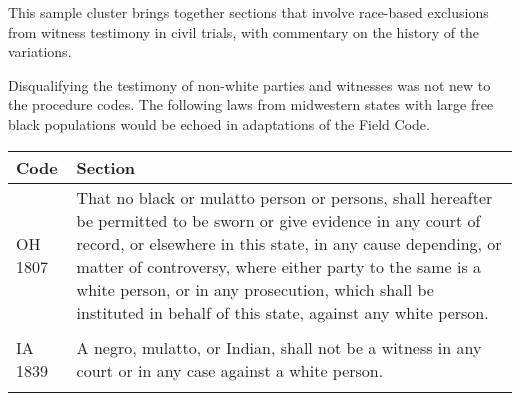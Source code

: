 \documentclass[12pt,]{article}
\begin{document}
This sample cluster brings together sections that involve race-based
exclusions from witness testimony in civil trials, with commentary on
the history of the variations.

Disqualifying the testimony of non-white parties and witnesses was not
new to the procedure codes. The following laws from midwestern states
with large free black populations would be echoed in adaptations of the
Field Code.

\begin{longtable}[]{@{}ll@{}}
\toprule
\begin{minipage}[b]{0.17\columnwidth}\raggedright
Code\strut
\end{minipage} & \begin{minipage}[b]{0.77\columnwidth}\raggedright
Section\strut
\end{minipage}\tabularnewline
\midrule
\endhead
\begin{minipage}[t]{0.17\columnwidth}\raggedright
OH 1807\strut
\end{minipage} & \begin{minipage}[t]{0.77\columnwidth}\raggedright
That no black or mulatto person or persons, shall hereafter be permitted
to be sworn or give evidence in any court of record, or elsewhere in
this state, in any cause depending, or matter of controversy, where
either party to the same is a white person, or in any prosecution, which
shall be instituted in behalf of this state, against any white
person.\strut
\end{minipage}\tabularnewline
\begin{minipage}[t]{0.17\columnwidth}\raggedright
\strut
\end{minipage} & \begin{minipage}[t]{0.77\columnwidth}\raggedright
\strut
\end{minipage}\tabularnewline
\begin{minipage}[t]{0.17\columnwidth}\raggedright
IA 1839\strut
\end{minipage} & \begin{minipage}[t]{0.77\columnwidth}\raggedright
A negro, mulatto, or Indian, shall not be a witness in any court or in
any case against a white person.\strut
\end{minipage}\tabularnewline
\begin{minipage}[t]{0.17\columnwidth}\raggedright
\strut
\end{minipage} & \begin{minipage}[t]{0.77\columnwidth}\raggedright
\strut
\end{minipage}\tabularnewline

\end{longtable}
\end{document}
